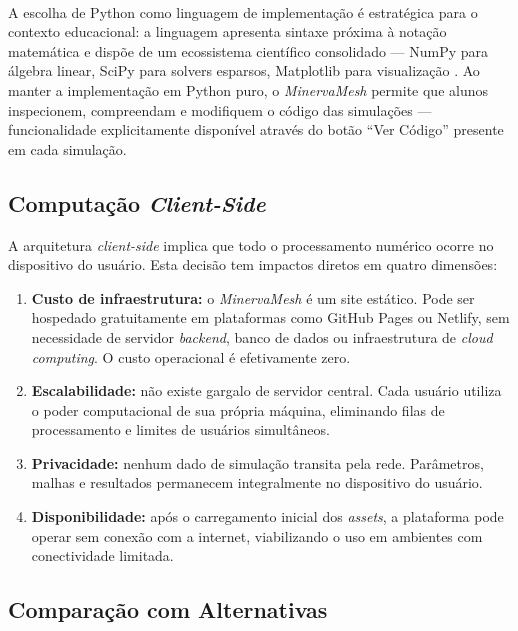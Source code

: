 \paragraph{}A escolha de Python como linguagem de implementação é estratégica para o contexto educacional: a linguagem apresenta sintaxe próxima à notação matemática e dispõe de um ecossistema científico consolidado --- NumPy para álgebra linear, SciPy para solvers esparsos, Matplotlib para visualização \cite{Harris2020}. Ao manter a implementação em Python puro, o \textit{MinervaMesh} permite que alunos inspecionem, compreendam e modifiquem o código das simulações --- funcionalidade explicitamente disponível através do botão ``Ver Código'' presente em cada simulação.

\subsection{Computação \textit{Client-Side}}
\label{sec:client_side}

A arquitetura \textit{client-side} implica que todo o processamento numérico ocorre no dispositivo do usuário. Esta decisão tem impactos diretos em quatro dimensões:

\begin{enumerate}
    \item \textbf{Custo de infraestrutura:} o \textit{MinervaMesh} é um site estático. Pode ser hospedado gratuitamente em plataformas como GitHub Pages ou Netlify, sem necessidade de servidor \textit{backend}, banco de dados ou infraestrutura de \textit{cloud computing}. O custo operacional é efetivamente zero.
    \item \textbf{Escalabilidade:} não existe gargalo de servidor central. Cada usuário utiliza o poder computacional de sua própria máquina, eliminando filas de processamento e limites de usuários simultâneos.
    \item \textbf{Privacidade:} nenhum dado de simulação transita pela rede. Parâmetros, malhas e resultados permanecem integralmente no dispositivo do usuário.
    \item \textbf{Disponibilidade:} após o carregamento inicial dos \textit{assets}, a plataforma pode operar sem conexão com a internet, viabilizando o uso em ambientes com conectividade limitada.
\end{enumerate}

\subsection{Comparação com Alternativas}
\label{sec:comparacao_alternativas}

